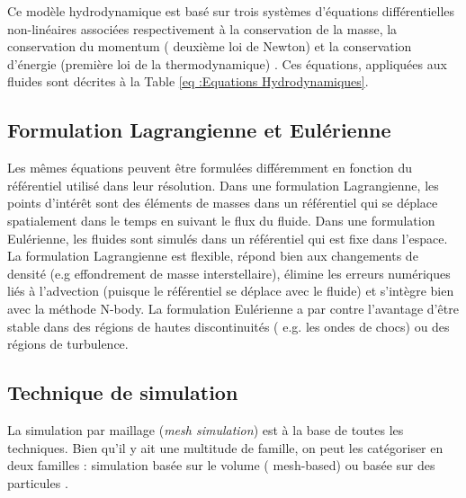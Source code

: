 \documentclass{article}
\begin{document}
Ce modèle hydrodynamique est basé sur trois systèmes d'équations différentielles non-linéaires associées respectivement à la conservation de la masse, la conservation du momentum ( deuxième loi de Newton) et la conservation d'énergie (première loi de la thermodynamique) \cite{Vogelsberger2020}. Ces équations, appliquées aux fluides sont décrites à la Table \ref{eq :Equations Hydrodynamiques}.

\subsection{Formulation Lagrangienne et Eulérienne}

Les mêmes équations peuvent être formulées différemment en fonction du référentiel utilisé dans leur résolution.  Dans une formulation Lagrangienne, les points d'intérêt sont des éléments de masses dans un référentiel qui se déplace spatialement dans le temps en suivant le flux du fluide. Dans une formulation Eulérienne, les fluides sont simulés dans un référentiel qui est fixe dans l'espace.  La formulation Lagrangienne est  flexible, répond bien aux changements de densité (e.g effondrement de masse interstellaire), élimine les erreurs numériques liés à l'advection (puisque le référentiel se déplace avec le fluide) et s'intègre bien avec la méthode N-body. La formulation Eulérienne a par contre l'avantage d'être stable dans des régions de hautes discontinuités ( e.g. les ondes de chocs) ou des régions de turbulence.


\subsection{Technique de simulation}

La simulation par maillage (\textit{mesh simulation}) est à la base de toutes les techniques. Bien qu'il y ait une multitude de famille, on peut les catégoriser en deux familles : simulation basée sur le volume ( mesh-based) ou basée sur des particules \citep{10.1093/mnras/stac3447}.
\end{document}
